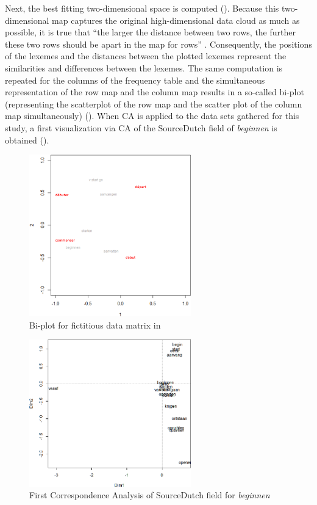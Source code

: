 Next, the best fitting two-dimensional space is computed (). Because this two-dimensional map captures the original high-dimensional data cloud as much as possible, it is true that “the larger the distance between two rows, the further these two rows should be apart in the map for rows” \citep[129]{baayen_analyzing_2008}. Consequently, the positions of the lexemes and the distances between the plotted lexemes represent the similarities and differences between the lexemes. The same computation is repeated for the columns of the frequency table and the simultaneous representation of the row map and the column map results in a so-called bi-plot (representing the scatterplot of the row map and the scatter plot of the column map simultaneously) (). When CA is applied to the data sets gathered for this study, a first visualization via CA of the SourceDutch field of \textit{beginnen} is obtained ().

\begin{figure}[p]
\includegraphics[width=7cm]{figures/Vandevoorde2-img18.png}
\caption{\label{fig:3:18}Bi-plot for fictitious data matrix in }
\end{figure}

\begin{figure}[p]
\includegraphics[width=7cm]{figures/Vandevoorde2-img19.png}
\caption{\label{fig:3:19}First Correspondence Analysis of SourceDutch field for \textit{beginnen}}
\end{figure}

